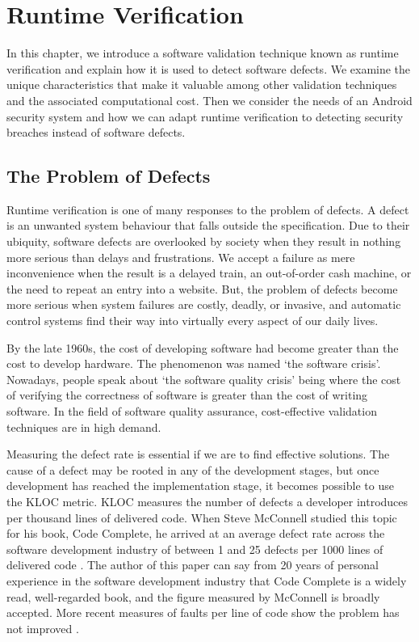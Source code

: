 \chapter{Runtime Verification}
\label{chap:Runtime Verification}

In this chapter, we introduce a software validation technique known as runtime verification and explain how it is used to detect software defects.  We examine the unique characteristics that make it valuable among other validation techniques and the associated computational cost.  Then we consider the needs of an Android security system and how we can adapt runtime verification to detecting security breaches instead of software defects.

\section{The Problem of Defects}

Runtime verification is one of many responses to the problem of defects.  A defect is an unwanted system behaviour that falls outside the specification.  Due to their ubiquity, software defects are overlooked by society when they result in nothing more serious than delays and frustrations.  We accept a failure as mere inconvenience when the result is a delayed train, an out-of-order cash machine, or the need to repeat an entry into a website.  But, the problem of defects become more serious when system failures are costly, deadly, or invasive, and automatic control systems find their way into virtually every aspect of our daily lives.

By the late 1960s, the cost of developing software had become greater than the cost to develop hardware.  The phenomenon was named `the software crisis'.  Nowadays, people speak about `the software quality crisis' being where the cost of verifying the correctness of software is greater than the cost of writing software.  In the field of software quality assurance, cost-effective validation techniques are in high demand.

Measuring the defect rate is essential if we are to find effective solutions.  The cause of a defect may be rooted in any of the development stages, but once development has reached the implementation stage, it becomes possible to use the KLOC metric.  KLOC measures the number of defects a developer introduces per thousand lines of delivered code.  When Steve McConnell studied this topic for his book, Code Complete, he arrived at an average defect rate across the software development industry of between 1 and 25 defects per 1000 lines of delivered code \cite{CodeCompleteKLOC}.  The author of this paper can say from 20 years of personal experience in the software development industry that Code Complete is a widely read, well-regarded book, and the figure measured by McConnell is broadly accepted.  More recent measures of faults per line of code show the problem has not improved \cite{BattleOfTheBugs} \cite{Coralogix} \cite{sogetilabs}.


